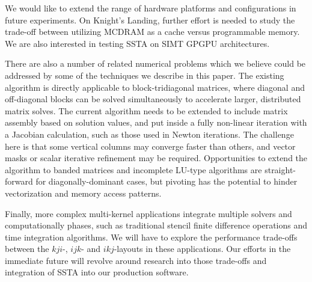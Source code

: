 \documentclass{sig-alternate}
\begin{document}
We would like to extend the range of hardware platforms and configurations in
  future experiments.
On Knight's Landing, further effort is needed to study the trade-off between
  utilizing MCDRAM as a cache versus programmable memory.
We are also interested in testing SSTA on SIMT GPGPU
  architectures.

There are also a number of related numerical problems which we believe could be
  addressed by some of the techniques we describe in this paper.
The existing algorithm is directly applicable to block-tridiagonal matrices,
  where diagonal and off-diagonal blocks can be solved simultaneously
  to accelerate larger, distributed matrix solves.
The current algorithm needs to be extended to include matrix assembly
  based on solution values, and put inside a fully non-linear iteration
  with a Jacobian calculation, such as those used in Newton iterations.
The challenge here is that some vertical columns may converge faster than
  others, and vector masks or scalar iterative refinement may be required.
Opportunities to extend the algorithm to banded matrices and incomplete LU-type 
  algorithms are straight-forward for diagonally-dominant cases, but
  pivoting has the potential to hinder vectorization and memory access patterns.

Finally, more complex multi-kernel applications integrate multiple solvers and
  computationally phases, such as traditional stencil finite difference
  operations and time integration algorithms. 
We will have to explore the performance trade-offs between
  the \(kji\)-, \(ijk\)- and \(ikj\)-layouts in these applications.
Our efforts in the immediate future will revolve around research into those
  trade-offs and integration of SSTA into our production software.

%



\end{document}

